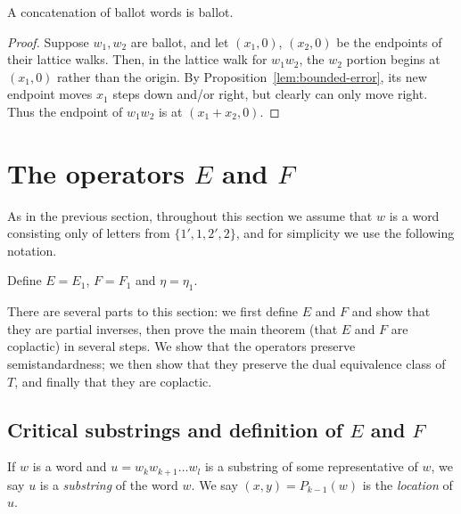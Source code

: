 \documentclass[ALCO,ThmDefs,Unicode,epreuves]{cedram}
\newcommand{\defn}[1]{\emph{#1}}
\begin{document}
\begin{coro} 
\label{cor:concat-ballot}
A concatenation of ballot words is ballot.
\end{coro}
\begin{proof}
Suppose $w_1, w_2$ are ballot, and let $(x_1,0)$, $(x_2,0)$ be the endpoints of their lattice walks. Then, in the lattice walk for $w_1w_2$, the $w_2$ portion begins at $(x_1,0)$ rather than the origin. By Proposition~\ref{lem:bounded-error}, its new endpoint moves $x_1$ steps down and/or right, but clearly can only move right. Thus the endpoint of $w_1w_2$ is at $(x_1+x_2,0)$.
\end{proof}

\section{The operators \texorpdfstring{$E$}{E} and \texorpdfstring{$F$}{F}}\label{sec:unprimed-ops}

As in the previous section, throughout this section we assume that $w$ is a word consisting only of letters from $\{1',1,2',2\}$, and for simplicity we use the following notation.

\begin{defi}
Define $E=E_1$, $F=F_1$ and $\eta = \eta_1$.
\end{defi}

There are several parts to this section: we first define $E$ and $F$ and show that they are partial inverses, then prove the main theorem (that $E$ and $F$ are coplactic) in several steps. We show that the operators preserve semistandardness; we then show that they preserve the dual equivalence class of $T$, and finally that they are coplactic.

\subsection{Critical substrings and definition of \texorpdfstring{$E$}{E} and \texorpdfstring{$F$}{F}}\label{sec:EFdefinition}

\begin{defi}
If $w$ is a word and $u = w_k w_{k+1} \dots w_l$ is a substring of some representative of $w$, we say $u$ is a \emph{substring} of the word $w$. We say $(x,y) = P_{k-1}(w)$ is the \defn{location} of $u$.
\end{defi}
\end{document}
